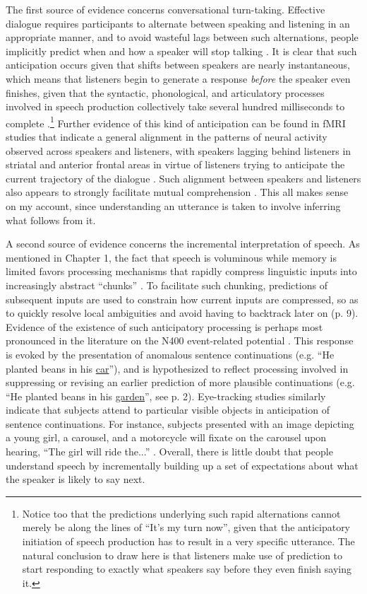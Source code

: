 The first source of evidence concerns conversational turn-taking. Effective dialogue requires participants to alternate between speaking and listening in an appropriate manner, and to avoid wasteful lags between such alternations, people implicitly predict when and how a speaker will stop talking \citep{Christiansen:2015,Pickering:2013}. It is clear that such anticipation occurs given that shifts between speakers are nearly instantaneous, which means that listeners begin to generate a response \textit{before} the speaker even finishes, given that the syntactic, phonological, and articulatory processes involved in speech production collectively take several hundred milliseconds to complete \citep{Pickering:2013}.\footnote{Notice too that the predictions underlying such rapid alternations cannot merely be along the lines of ``It's my turn now'', given that the anticipatory initiation of speech production has to result in a very specific utterance. The natural conclusion to draw here is that listeners make use of prediction to start responding to exactly what speakers say before they even finish saying it.} Further evidence of this kind of anticipation can be found in fMRI studies that indicate a general alignment in the patterns of neural activity observed across speakers and listeners, with speakers lagging behind listeners in striatal and anterior frontal areas in virtue of listeners trying to anticipate the current trajectory of the dialogue \citep[reviewed in][]{Christiansen:2015}.  Such alignment between speakers and listeners also appears to strongly facilitate mutual comprehension \citep{Pickering:2013,Christiansen:2015}. This all makes sense on my account, since understanding an utterance is taken to involve inferring what follows from it. 

A second source of evidence concerns the incremental interpretation of speech. As mentioned in Chapter 1, the fact that speech is voluminous while memory is limited favors processing mechanisms that rapidly compress linguistic inputs into increasingly abstract ``chunks'' \citep{Christiansen:2015}. To facilitate such chunking, predictions of subsequent inputs are used to constrain how current inputs are compressed, so as to quickly resolve local ambiguities and avoid having to backtrack later on (p. 9). Evidence of the existence of such anticipatory processing is perhaps most pronounced in the literature on the N400 event-related potential \citep{Federmeier:2007,Kutas:2011}. This response is evoked by the presentation of anomalous sentence continuations (e.g. ``He planted beans in his \underline{car}''), and is hypothesized to reflect processing involved in suppressing or revising an earlier prediction of more plausible continuations (e.g. ``He planted beans in his \underline{garden}'', see p. 2). Eye-tracking studies similarly indicate that subjects attend to particular visible objects in anticipation of sentence continuations. For instance, subjects presented with an image depicting a young girl, a carousel, and a motorcycle will fixate on the carousel upon hearing, ``The girl will ride the...'' \citep[][p. 194]{Kutas:2009}. Overall, there is little doubt that people understand speech by incrementally building up a set of expectations about what the speaker is likely to say next. 

